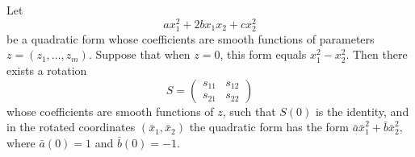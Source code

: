 Let
$$a x_1^2 + 2b x_1 x_2 + c x_2^2$$
be a quadratic form whose coefficients are smooth functions of parameters $z = (z_1, \ldots, z_m)$. Suppose that when $z = 0$, this form equals $x_1^2 - x_2^2$. Then there exists a rotation
$$S = \begin{pmatrix} s_{11} & s_{12} \\ s_{21} & s_{22} \end{pmatrix}$$
whose coefficients are smooth functions of $z$, such that $S(0)$ is the identity, and in the rotated coordinates $(\bar{x}_1, \bar{x}_2)$ the quadratic form has the form $\bar{a} \bar{x}_1^2 + \bar{b} \bar{x}_2^2$, where $\bar{a}(0) = 1$ and $\bar{b}(0) = -1$.
